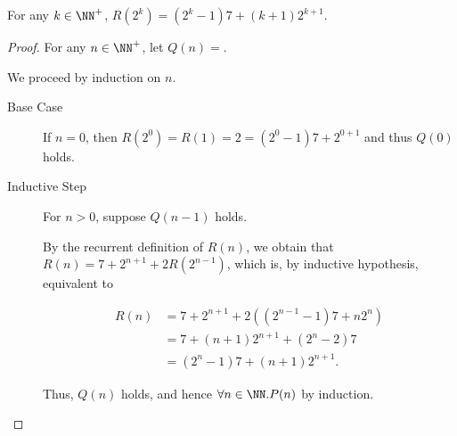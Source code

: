\documentclass[11pt]{scrartcl}
\begin{document}
\begin{claim*}
  For any $k\in\NN^+$, $R(2^k) = (2^k-1)7+(k+1)2^{k+1}$.
\end{claim*}
\begin{proof}
  \hfill

  For any $n\in\NN^+$, let $Q(n) =$.

  We proceed by induction on $n$.

  \begin{description}
  \item[Base Case] \hfill

    If $n=0$, then $R(2^0) = R(1) = 2 = (2^0-1)7+2^{0+1}$ and thus $Q(0)$ holds.
  \item[Inductive Step] \hfill

    For $n>0$, suppose $Q(n-1)$ holds.

    By the recurrent definition of $R(n)$, we obtain that
    $R(n) = 7+2^{n+1}+ 2R(2^{n-1})$, which is, by inductive
    hypothesis, equivalent to

    \begin{align}
      R(n) &= 7+ 2^{n+1}+2((2^{n-1}-1)7+n2^{n})\\
           &= 7+(n+1)2^{n+1}+(2^n-2)7\\
           &=(2^n-1)7+(n+1)2^{n+1}.
    \end{align}

    Thus, $Q(n)$ holds, and hence $\forall n\in\NN.P(n)$ by induction.
  \end{description}
\end{proof}
\end{document}
